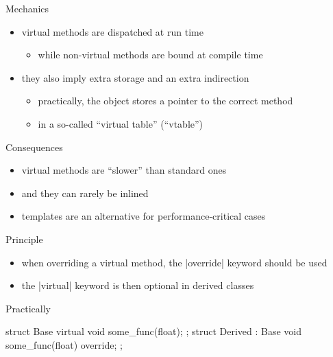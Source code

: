 \begin{frame}[fragile]
  \begin{block}{Mechanics}
    \begin{itemize}
    \item virtual methods are dispatched at run time
      \begin{itemize}
      \item while non-virtual methods are bound at compile time
      \end{itemize}
    \item they also imply extra storage and an extra indirection
      \begin{itemize}
      \item practically, the object stores a pointer to the correct method
      \item in a so-called ``virtual table'' (``vtable'')
      \end{itemize}
    \end{itemize}
  \end{block}
  \begin{alertblock}{Consequences}
    \begin{itemize}
    \item virtual methods are ``slower'' than standard ones
    \item and they can rarely be inlined
    \item templates are an alternative for performance-critical cases
    \end{itemize}
  \end{alertblock}
\end{frame}

\begin{frame}[fragile]
  \begin{block}{Principle}
    \begin{itemize}
    \item when overriding a virtual method, the \cppinline|override| keyword should be used
    \item the \cppinline|virtual| keyword is then optional in derived classes
    \end{itemize}
  \end{block}
  \begin{exampleblock}{Practically}
    \begin{cppcode}
      struct Base {
        virtual void some_func(float);
      };
      struct Derived : Base {
        void some_func(float) override;
      };
    \end{cppcode}
  \end{exampleblock}
\end{frame}

